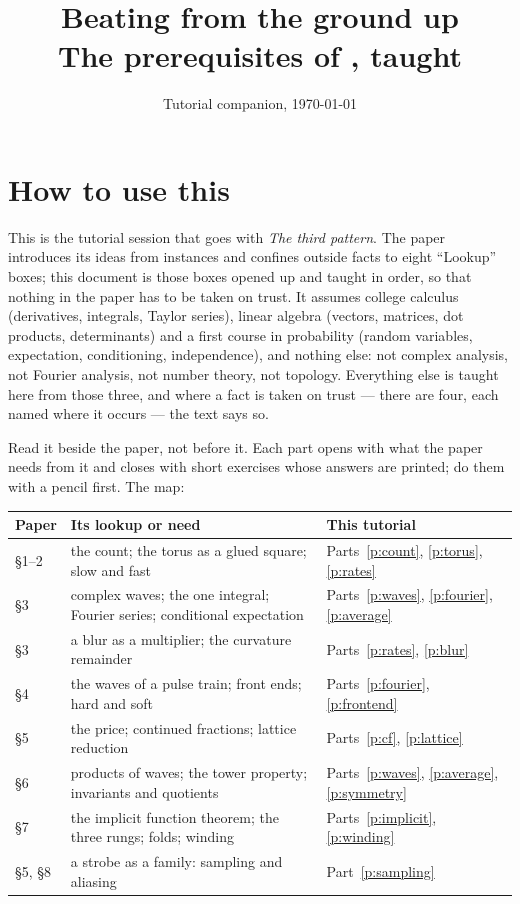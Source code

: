 \documentclass[10pt]{article}
\title{Beating from the ground up\\[0.3em]\large The prerequisites of \paper, taught}
\author{}
\date{Tutorial companion, \today}
\theoremstyle{plain}
\theoremstyle{definition}
\newcommand{\paper}{\emph{The third pattern}}
\begin{document}
\maketitle

\section*{How to use this}

This is the tutorial session that goes with \paper. The paper introduces
its ideas from instances and confines outside facts to eight ``Lookup''
boxes; this document is those boxes opened up and taught in order, so that
nothing in the paper has to be taken on trust. It assumes college calculus
(derivatives, integrals, Taylor series), linear algebra (vectors, matrices,
dot products, determinants) and a first course in probability (random
variables, expectation, conditioning, independence), and nothing else: not
complex analysis, not Fourier analysis, not number theory, not topology.
Everything else is taught here from those three, and where a fact is taken
on trust --- there are four, each named where it occurs --- the text says so.

Read it beside the paper, not before it. Each part opens with what the
paper needs from it and closes with short exercises whose answers are
printed; do them with a pencil first. The map:

\begin{center}\small
\begin{tabular}{@{}lll@{}}
\toprule
Paper & Its lookup or need & This tutorial \\
\midrule
\S1--2 & the count; the torus as a glued square; slow and fast & Parts~\ref{p:count}, \ref{p:torus}, \ref{p:rates} \\
\S3 & complex waves; the one integral; Fourier series; conditional expectation & Parts~\ref{p:waves}, \ref{p:fourier}, \ref{p:average} \\
\S3 & a blur as a multiplier; the curvature remainder & Parts~\ref{p:rates}, \ref{p:blur} \\
\S4 & the waves of a pulse train; front ends; hard and soft & Parts~\ref{p:fourier}, \ref{p:frontend} \\
\S5 & the price; continued fractions; lattice reduction & Parts~\ref{p:cf}, \ref{p:lattice} \\
\S6 & products of waves; the tower property; invariants and quotients & Parts~\ref{p:waves}, \ref{p:average}, \ref{p:symmetry} \\
\S7 & the implicit function theorem; the three rungs; folds; winding & Parts~\ref{p:implicit}, \ref{p:winding} \\
\S5, \S8 & a strobe as a family: sampling and aliasing & Part~\ref{p:sampling} \\
\bottomrule
\end{tabular}
\end{center}
\end{document}
